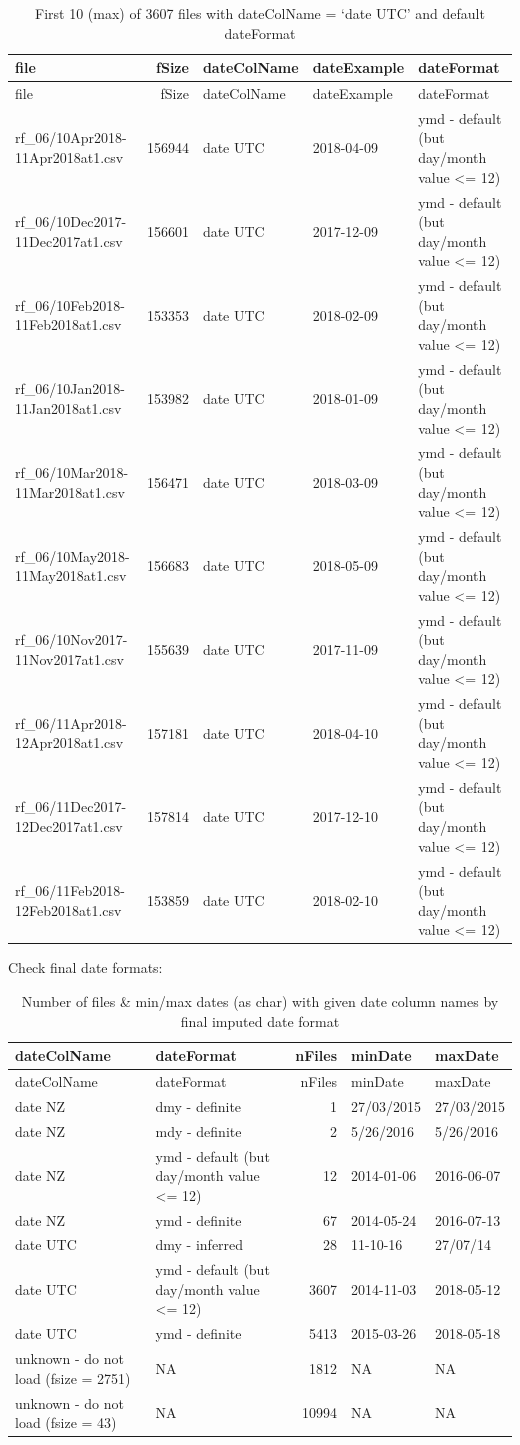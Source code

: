 \documentclass[]{article}
\begin{document}
\begin{longtable}[]{@{}lrlll@{}}
\caption{First 10 (max) of 3607 files with dateColName = `date UTC' and
default dateFormat}\tabularnewline
\toprule
file & fSize & dateColName & dateExample & dateFormat\tabularnewline
\midrule
\endfirsthead
\toprule
file & fSize & dateColName & dateExample & dateFormat\tabularnewline
\midrule
\endhead
rf\_06/10Apr2018-11Apr2018at1.csv & 156944 & date UTC & 2018-04-09 & ymd
- default (but day/month value \textless{}= 12)\tabularnewline
rf\_06/10Dec2017-11Dec2017at1.csv & 156601 & date UTC & 2017-12-09 & ymd
- default (but day/month value \textless{}= 12)\tabularnewline
rf\_06/10Feb2018-11Feb2018at1.csv & 153353 & date UTC & 2018-02-09 & ymd
- default (but day/month value \textless{}= 12)\tabularnewline
rf\_06/10Jan2018-11Jan2018at1.csv & 153982 & date UTC & 2018-01-09 & ymd
- default (but day/month value \textless{}= 12)\tabularnewline
rf\_06/10Mar2018-11Mar2018at1.csv & 156471 & date UTC & 2018-03-09 & ymd
- default (but day/month value \textless{}= 12)\tabularnewline
rf\_06/10May2018-11May2018at1.csv & 156683 & date UTC & 2018-05-09 & ymd
- default (but day/month value \textless{}= 12)\tabularnewline
rf\_06/10Nov2017-11Nov2017at1.csv & 155639 & date UTC & 2017-11-09 & ymd
- default (but day/month value \textless{}= 12)\tabularnewline
rf\_06/11Apr2018-12Apr2018at1.csv & 157181 & date UTC & 2018-04-10 & ymd
- default (but day/month value \textless{}= 12)\tabularnewline
rf\_06/11Dec2017-12Dec2017at1.csv & 157814 & date UTC & 2017-12-10 & ymd
- default (but day/month value \textless{}= 12)\tabularnewline
rf\_06/11Feb2018-12Feb2018at1.csv & 153859 & date UTC & 2018-02-10 & ymd
- default (but day/month value \textless{}= 12)\tabularnewline
\bottomrule
\end{longtable}

Check final date formats:

\begin{longtable}[]{@{}llrll@{}}
\caption{Number of files \& min/max dates (as char) with given date
column names by final imputed date format}\tabularnewline
\toprule
dateColName & dateFormat & nFiles & minDate & maxDate\tabularnewline
\midrule
\endfirsthead
\toprule
dateColName & dateFormat & nFiles & minDate & maxDate\tabularnewline
\midrule
\endhead
date NZ & dmy - definite & 1 & 27/03/2015 & 27/03/2015\tabularnewline
date NZ & mdy - definite & 2 & 5/26/2016 & 5/26/2016\tabularnewline
date NZ & ymd - default (but day/month value \textless{}= 12) & 12 &
2014-01-06 & 2016-06-07\tabularnewline
date NZ & ymd - definite & 67 & 2014-05-24 & 2016-07-13\tabularnewline
date UTC & dmy - inferred & 28 & 11-10-16 & 27/07/14\tabularnewline
date UTC & ymd - default (but day/month value \textless{}= 12) & 3607 &
2014-11-03 & 2018-05-12\tabularnewline
date UTC & ymd - definite & 5413 & 2015-03-26 &
2018-05-18\tabularnewline
unknown - do not load (fsize = 2751) & NA & 1812 & NA &
NA\tabularnewline
unknown - do not load (fsize = 43) & NA & 10994 & NA & NA\tabularnewline
\bottomrule
\end{longtable}
\end{document}
